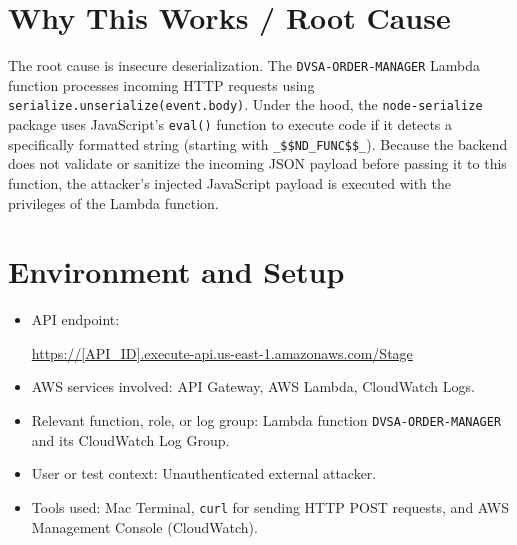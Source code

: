 \documentclass[12pt]{report}
\begin{document}
\section{Why This Works / Root Cause}
The root cause is insecure deserialization. The \texttt{DVSA-ORDER-MANAGER} Lambda function processes incoming HTTP requests using \texttt{serialize.unserialize(event.body)}. Under the hood, the \texttt{node-serialize} package uses JavaScript's \texttt{eval()} function to execute code if it detects a specifically formatted string (starting with \texttt{\_\$\$ND\_FUNC\$\$\_}). Because the backend does not validate or sanitize the incoming JSON payload before passing it to this function, the attacker's injected JavaScript payload is executed with the privileges of the Lambda function.

\section{Environment and Setup}
\begin{itemize}
  \item API endpoint:\par
  \url{https://[API_ID].execute-api.us-east-1.amazonaws.com/Stage}
  \item AWS services involved: API Gateway, AWS Lambda, CloudWatch Logs.
  \item Relevant function, role, or log group: Lambda function \nolinkurl{DVSA-ORDER-MANAGER} and its CloudWatch Log Group.
  \item User or test context: Unauthenticated external attacker.
  \item Tools used: Mac Terminal, \texttt{curl} for sending HTTP POST requests, and AWS Management Console (CloudWatch).
\end{itemize}
\end{document}
